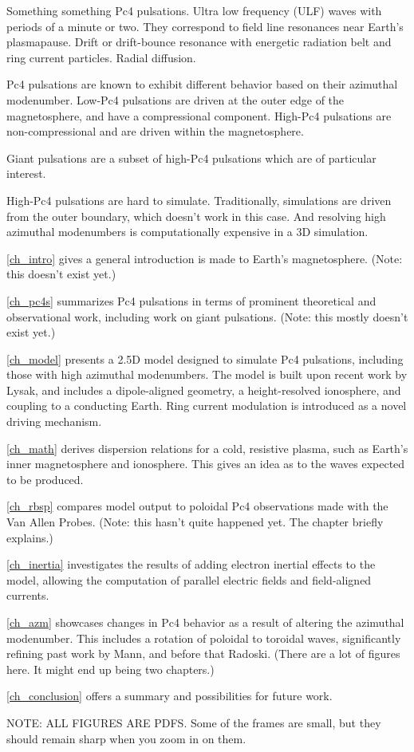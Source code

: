 
Something something Pc4 pulsations. Ultra low frequency (ULF) waves with periods of a minute or two. They correspond to field line resonances near Earth's plasmapause. Drift or drift-bounce resonance with energetic radiation belt and ring current particles. Radial diffusion. 

Pc4 pulsations are known to exhibit different behavior based on their azimuthal modenumber. Low-\azm Pc4 pulsations are driven at the outer edge of the magnetosphere, and have a compressional component. High-\azm Pc4 pulsations are non-compressional and are driven within the magnetosphere. 

Giant pulsations are a subset of high-\azm Pc4 pulsations which are of particular interest. 

High-\azm Pc4 pulsations are hard to simulate. Traditionally, simulations are driven from the outer boundary, which doesn't work in this case. And resolving high azimuthal modenumbers is computationally expensive in a 3D simulation. 

\cref{ch_intro} gives a general introduction is made to Earth's magnetosphere. (Note: this doesn't exist yet.)

\cref{ch_pc4s} summarizes Pc4 pulsations in terms of prominent theoretical and observational work, including work on giant pulsations. (Note: this mostly doesn't exist yet.)

\cref{ch_model} presents a 2.5D model designed to simulate Pc4 pulsations, including those with high azimuthal modenumbers. The model is built upon recent work by Lysak, and includes a dipole-aligned geometry, a height-resolved ionosphere, and coupling to a conducting Earth. Ring current modulation is introduced as a novel driving mechanism. 

\cref{ch_math} derives dispersion relations for a cold, resistive plasma, such as Earth's inner magnetosphere and ionosphere. This gives an idea as to the waves expected to be produced. 

\cref{ch_rbsp} compares model output to poloidal Pc4 observations made with the Van Allen Probes. (Note: this hasn't quite happened yet. The chapter briefly explains.)

\cref{ch_inertia} investigates the results of adding electron inertial effects to the model, allowing the computation of parallel electric fields and field-aligned currents. 

\cref{ch_azm} showcases changes in Pc4 behavior as a result of altering the azimuthal modenumber. This includes a rotation of poloidal to toroidal waves, significantly refining past work by Mann, and before that Radoski. (There are a lot of figures here. It might end up being two chapters.)

\cref{ch_conclusion} offers a summary and possibilities for future work. 

NOTE: ALL FIGURES ARE PDFS. Some of the frames are small, but they should remain sharp when you zoom in on them. 


